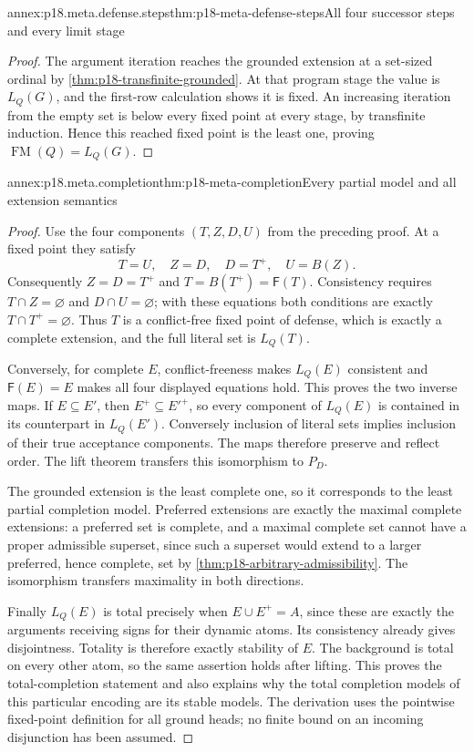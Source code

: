 \begin{annexitem}{annex:p18.meta.defense.steps}{thm:p18-meta-defense-steps}{All four successor steps and every limit stage}
\begin{proof}
The argument iteration reaches the grounded extension
at a set-sized ordinal by
\cref{thm:p18-transfinite-grounded}.
At that program stage the value is \(L_Q(G)\),
and the first-row calculation shows it is fixed.
An increasing iteration from the empty set is below
every fixed point at every stage, by transfinite
induction. Hence this reached fixed point is the
least one, proving \(\operatorname{FM}(Q)=L_Q(G)\).
\end{proof}
\end{annexitem}

\begin{annexitem}{annex:p18.meta.completion}{thm:p18-meta-completion}{Every partial model and all extension semantics}
\begin{proof}
Use the four components \((T,Z,D,U)\) from the preceding
proof. At a fixed point they satisfy
\[
                       T=U,\quad Z=D,\quad D=T^+,\quad U=B(Z).
\]
Consequently \(Z=D=T^+\) and
\(T=B(T^+)=\mathsf F(T)\).
Consistency requires \(T\cap Z=\varnothing\) and
\(D\cap U=\varnothing\); with these equations both
conditions are exactly \(T\cap T^+=\varnothing\).
Thus \(T\) is a conflict-free fixed point of defense,
which is exactly a complete extension, and the full
literal set is \(L_Q(T)\).

Conversely, for complete \(E\), conflict-freeness makes
\(L_Q(E)\) consistent and \(\mathsf F(E)=E\) makes all
four displayed equations hold. This proves the two
inverse maps. If \(E\subseteq E'\), then
\(E^+\subseteq E'^+\), so every component of \(L_Q(E)\)
is contained in its counterpart in \(L_Q(E')\).
Conversely inclusion of literal sets implies inclusion
of their true acceptance components. The maps therefore
preserve and reflect order.
The lift theorem transfers this isomorphism to \(P_D\).

The grounded extension is the least complete one,
so it corresponds to the least partial completion
model. Preferred extensions are exactly the maximal
complete extensions: a preferred set is complete,
and a maximal complete set cannot have a proper
admissible superset, since such a superset would
extend to a larger preferred, hence complete, set
by \cref{thm:p18-arbitrary-admissibility}.
The isomorphism transfers maximality in both
directions.

Finally \(L_Q(E)\) is total precisely when
\(E\cup E^+=A\), since these are exactly the arguments
receiving signs for their dynamic atoms. Its
consistency already gives disjointness. Totality
is therefore exactly stability of \(E\).
The background is total on every other atom, so
the same assertion holds after lifting. This proves
the total-completion statement and also explains
why the total completion models of this particular
encoding are its stable models. The derivation uses
the pointwise fixed-point definition for all ground
heads; no finite bound on an incoming disjunction
has been assumed.
\end{proof}
\end{annexitem}

